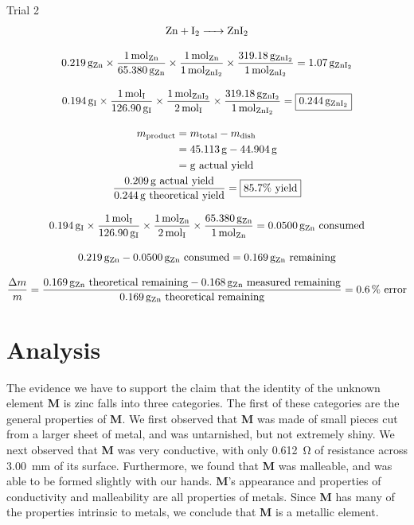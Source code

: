 \documentclass[titlepage]{article}
\begin{document}
Trial 2
\begin{gather*}
    \ce{Zn + I2 -> ZnI2} \\[2ex]
    \qty{0.219}{\gram\of{Zn}}\times\frac{\qty{1}{\mol\of{Zn}}}{\qty{65.380}{\gram\of{Zn}}}\times\frac{\qty{1}{\mol\of{Zn}}}{\qty{1}{\mol\of{\ce{ZnI2}}}}\times\frac{\qty{319.18}{\gram\of{\ce{ZnI2}}}}{\qty{1}{\mol\of{\ce{ZnI2}}}}=\qty{1.07}{\gram\of{\ce{ZnI2}}} \\[2ex]
    \qty{0.194}{\gram\of{I}}\times\frac{\qty{1}{\mol\of{I}}}{\qty{126.90}{\gram\of{I}}}\times\frac{\qty{1}{\mol\of{\ce{ZnI2}}}}{\qty{2}{\mol\of{I}}}\times\frac{\qty{319.18}{\gram\of{\ce{ZnI2}}}}{\qty{1}{\mol\of{\ce{ZnI2}}}}=\boxed{\qty{0.244}{\gram\of{\ce{ZnI2}}}} \\[2ex]
    \begin{split}
    m_{\text{product}} &= m_{\text{total}} - m_{\text{dish}} \\
                       &= \qty{45.113}{\gram} - \qty{44.904}{\gram} \\
                       &= \qty{}{\gram} \text{ actual yield} \\
    \end{split} \\
    \frac{\qty{0.209}{\gram}\mathrm{\ actual\ yield}}{\qty{0.244}{\gram}\mathrm{\ theoretical\ yield}}=\boxed{85.7\unit{\percent}\mathrm{\ yield}} \\[2ex]
    \qty{0.194}{\gram\of{I}}\times\frac{\qty{1}{\mol\of{I}}}{\qty{126.90}{\gram\of{I}}}\times\frac{\qty{1}{\mol\of{Zn}}}{\qty{2}{\mol\of{I}}}\times\frac{\qty{65.380}{\gram\of{Zn}}}{\qty{1}{\mol\of{Zn}}}=\qty{0.0500}{\gram\of{Zn}}\text{ consumed} \\[2ex]
    \qty{0.219}{\gram\of{Zn}}-\qty{0.0500}{\gram\of{Zn}}\text{ consumed}=\qty{0.169}{\gram\of{Zn}}\text{ remaining} \\[2ex]
    \frac{\Delta m}{m}=\frac{\qty{0.169}{\gram\of{Zn}}\text{ theoretical remaining}-\qty{0.168}{\gram\of{Zn}}\text{ measured remaining}}{\qty{0.169}{\gram\of{Zn}}\text{ theoretical remaining}}=\qty{0.6}{\percent}\text{ error}
\end{gather*}

\section{Analysis}

The evidence we have to support the claim that the identity of the unknown element \textbf{M} is zinc falls into three categories. The first of these categories are the general properties of \textbf{M}. We first observed that \textbf{M} was made of small pieces cut from a larger sheet of metal, and was untarnished, but not extremely shiny. We next observed that \textbf{M} was very conductive, with only \qty{0.612}{\ohm} of resistance across \qty{3.00}{\milli\meter} of its surface. Furthermore, we found that \textbf{M} was malleable, and was able to be formed slightly with our hands. \textbf{M}'s appearance and properties of conductivity and malleability are all properties of metals. Since \textbf{M} has many of the properties intrinsic to metals, we conclude that \textbf{M} is a metallic element. 
\end{document}
